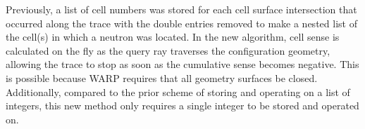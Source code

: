 Previously, a list of cell numbers was stored for each cell surface intersection that occurred along the
trace with the double entries removed to make a nested list of the cell(s) in which a neutron was 
located. In the new algorithm, cell sense is calculated on the fly as the query ray traverses the
configuration geometry, allowing the trace to stop as soon as the cumulative sense becomes negative. This
is possible because WARP requires that all geometry surfaces be closed. Additionally, compared to the
prior scheme of storing and operating on a list of integers, this new method only requires a single 
integer to be stored and operated on.
